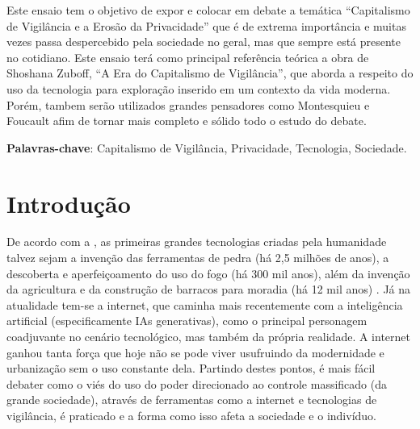 \documentclass[
	12pt,
	openright,
	twoside,
	a4paper,
	english,
	french,
	spanish,
	brazil
]{abntex2}
\begin{document}
  \frenchspacing
  \imprimircapa
  \imprimirfolhaderosto*

  \setlength{\absparsep}{18pt}
  \begin{resumo}
    Este ensaio tem o objetivo de expor e colocar em debate a temática
    ``Capitalismo de Vigilância e a Erosão da Privacidade'' que é de extrema
    importância e muitas vezes passa despercebido pela sociedade no geral, mas
    que sempre está presente no cotidiano. Este ensaio terá como principal
    referência teórica a obra de Shoshana Zuboff, ``A Era do Capitalismo de
    Vigilância'', que aborda a respeito do uso da tecnologia para exploração
    inserido em um contexto da vida moderna. Porém, tambem serão utilizados
    grandes pensadores como Montesquieu e Foucault afim de tornar mais completo
    e sólido todo o estudo do debate.

    \textbf{Palavras-chave}:
      Capitalismo de Vigilância, Privacidade, Tecnologia, Sociedade.
  \end{resumo}


  \textual

  \chapter{Introdução}

  De acordo com a , as primeiras grandes
  tecnologias criadas pela humanidade talvez sejam a invenção das ferramentas de
  pedra (há 2,5 milhões de anos), a descoberta e aperfeiçoamento do uso do fogo
  (há 300 mil anos), além da invenção da agricultura e da construção de barracos
  para moradia (há 12 mil anos) \cite{harari-sapiens}. Já na atualidade tem-se a
  internet, que caminha mais recentemente com a inteligência artificial
  (especificamente IAs generativas), como o principal personagem coadjuvante no
  cenário tecnológico, mas também da própria realidade. A internet ganhou tanta
  força que hoje não se pode viver usufruindo da modernidade e urbanização sem o
  uso constante dela. Partindo destes pontos, é mais fácil debater como o viés
  do uso do poder direcionado ao controle massificado (da grande sociedade),
  através de ferramentas como a internet e tecnologias de vigilância, é
  praticado e a forma como isso afeta a sociedade e o indivíduo.
\end{document}
